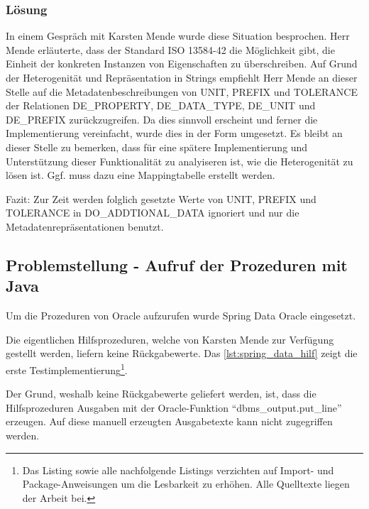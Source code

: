\subsubsection{Lösung}

In einem Gespräch mit Karsten Mende wurde diese Situation besprochen. Herr Mende erläuterte, dass der Standard ISO 13584-42 \citep[vgl.][]{iso13584-42} die Möglichkeit gibt, die Einheit der konkreten Instanzen von Eigenschaften zu überschreiben. Auf Grund der Heterogenität und Repräsentation in Strings empfiehlt Herr Mende an dieser Stelle auf die Metadatenbeschreibungen von UNIT, PREFIX und TOLERANCE der Relationen DE\_PROPERTY, DE\_DATA\_TYPE, DE\_UNIT und DE\_PREFIX zurückzugreifen. 
Da dies sinnvoll erscheint und ferner die Implementierung vereinfacht, wurde dies in der Form umgesetzt. Es bleibt an dieser Stelle zu bemerken, dass für eine spätere Implementierung und Unterstützung dieser Funktionalität zu analyiseren ist, wie die Heterogenität zu lösen ist. Ggf. muss dazu eine Mappingtabelle erstellt werden.

Fazit:
Zur Zeit werden folglich gesetzte Werte von UNIT, PREFIX und TOLERANCE in DO\_ADDTIONAL\_DATA ignoriert und nur die Metadatenrepräsentationen benutzt.  

\subsection{Problemstellung - Aufruf der Prozeduren mit Java}
Um die Prozeduren von Oracle aufzurufen wurde Spring Data Oracle eingesetzt. 

Die eigentlichen Hilfsprozeduren, welche von Karsten Mende zur Verfügung gestellt werden, liefern keine Rückgabewerte. Das \autoref{lst:spring_data_hilf} zeigt die erste Testimplementierung\footnote{Das Listing sowie alle nachfolgende Listings verzichten auf Import- und Package-Anweisungen um die Lesbarkeit zu erhöhen. Alle Quelltexte liegen der Arbeit bei.}. 

Der Grund, weshalb keine Rückgabewerte geliefert werden, ist, dass die Hilfsprozeduren Ausgaben mit der Oracle-Funktion \enquote{dbms\_output.put\_line} erzeugen. Auf diese manuell erzeugten Ausgabetexte kann nicht zugegriffen werden. 

